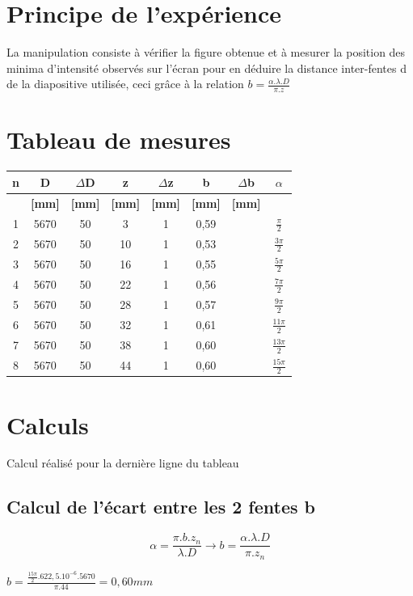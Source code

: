 \documentclass[11pt,a4paper]{report}
\begin{document}
	\section{Principe de l'expérience}
	La manipulation consiste à vérifier la figure obtenue et à mesurer la position des minima d'intensité observés sur l'écran pour en déduire la distance inter-fentes d de la diapositive utilisée, ceci grâce à la relation $b = \frac{\alpha .\lambda.D }{\pi.z}$
	\section{Tableau de mesures}
	\begin{center}		
	\begin{tabular}{|c|c|c|c|c|c|c|c|}
		\hline
		\bf n & \bf D & \bf $\Delta$D & \bf z & \bf $\Delta$z & \bf b & \bf $\Delta$b & \bf $\alpha$ \\
		\hline
		 & \bf [mm] & \bf [mm] & \bf [mm] & \bf [mm] & \bf [mm]  & \bf [mm]  &  \\
		\hline
		1 & 5670 & 50 & 3 &   1&0,59&  & $\frac{\pi}{2}$\\
		2 & 5670 & 50 & 10 &  1&0,53&  & $\frac{3\pi}{2}$\\
		3 & 5670 & 50 & 16 &  1&0,55&  & $\frac{5\pi}{2}$\\
		4 & 5670 & 50 & 22 &  1&0,56&  & $\frac{7\pi}{2}$\\
		5 & 5670 & 50 & 28 &  1&0,57&  & $\frac{9\pi}{2}$\\
		6 & 5670 & 50 & 32 &  1&0,61&  & $\frac{11\pi}{2}$\\
		7 & 5670 & 50 & 38 &  1&0,60&  & $\frac{13\pi}{2}$\\
		8 & 5670 & 50 & 44 &  1&0,60 &  & $\frac{15\pi}{2}$\\
		\hline
	\end{tabular}
	\end{center}
	\section{Calculs}
		Calcul réalisé pour la dernière ligne du tableau
		\subsection{Calcul de l'écart entre les 2 fentes b}
		\begin{equation}
		\alpha = \frac{\pi.b.z_{n}}{\lambda.D} \rightarrow b = \frac{\alpha .\lambda.D }{\pi.z_{n}} 
		\end{equation}
\begin{center}$ b = \frac{\frac{15\pi}{2}.622,5.10^{-6}.5670}{\pi.44} = 0,60 mm$\end{center}
\end{document}
